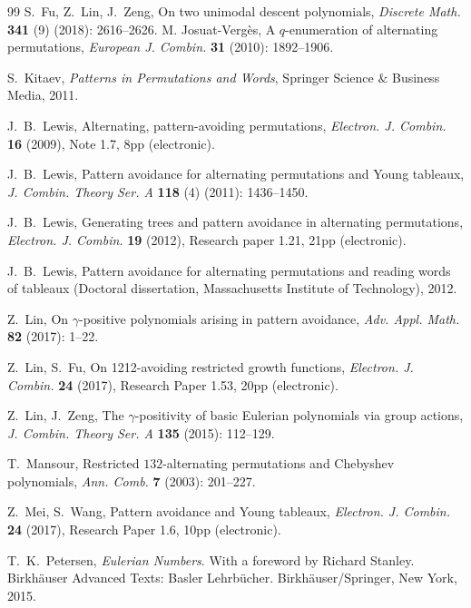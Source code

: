 \documentclass[12pt,reqno]{amsart}
\numberwithin{equation}{section}
\theoremstyle{plain}
\theoremstyle{definition}
\begin{document}
\begin{thebibliography}{99}
 S.~Fu, Z.~Lin, J.~Zeng, On two unimodal descent polynomials, \textit{Discrete Math.} {\bf 341} (9) (2018): 2616--2626.
%
%
 M. Josuat-Verg\`{e}s, A $q$-enumeration of alternating permutations, \textit{European J. Combin.} {\bf 31} (2010): 1892--1906.

 S.~Kitaev, \textit{Patterns in Permutations and Words}, Springer Science $\&$ Business Media, 2011.

 J.~B.~Lewis, Alternating, pattern-avoiding permutations, \textit{Electron. J. Combin.} {\bf 16} (2009), Note 1.7, 8pp (electronic).

 J.~B.~Lewis, Pattern avoidance for alternating permutations and Young tableaux, \textit{J. Combin. Theory Ser. A} {\bf 118} (4) (2011): 1436--1450.

 J.~B.~Lewis, Generating trees and pattern avoidance in alternating permutations, \textit{Electron. J. Combin.} {\bf 19} (2012), Research paper 1.21, 21pp (electronic).

 J.~B.~Lewis, Pattern avoidance for alternating permutations and reading words of tableaux (Doctoral dissertation, Massachusetts Institute of Technology), 2012.

Z.~Lin, On $\gamma$-positive polynomials arising in pattern avoidance, \textit{Adv. Appl. Math.} {\bf 82} (2017): 1--22.

 Z.~Lin, S.~Fu, On 1212-avoiding restricted growth functions, \textit{Electron. J. Combin.} {\bf24} (2017), Research Paper 1.53, 20pp (electronic).

 Z.~Lin, J.~Zeng, The $\gamma$-positivity of basic Eulerian polynomials via group actions, \textit{J. Combin. Theory Ser. A} {\bf 135} (2015): 112--129.

 T.~Mansour, Restricted $132$-alternating permutations and Chebyshev polynomials, \textit{Ann. Comb.} {\bf 7} (2003): 201--227.

 Z.~Mei, S.~Wang, Pattern avoidance and Young tableaux, \textit{Electron. J. Combin.} {\bf 24} (2017), Research Paper 1.6, 10pp (electronic).

T.~K.~Petersen,  \textit{Eulerian Numbers}. With a foreword by Richard Stanley. Birkh\"auser Advanced Texts: Basler Lehrb\"ucher. Birkh\"auser/Springer, New York, 2015.


\end{thebibliography}
\end{document}
